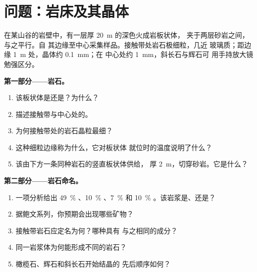 \section{问题：岩床及其晶体}

\begin{problem}
\label{pb:g11:igneous-rocks:1}
在某山谷的岩壁中，有一层厚 \qty{20}{m} 的深色火成岩板状体，
夹于两层砂岩之间，与之平行。自
其边缘至中心采集样品。接触带处岩石极细粒，几近
玻璃质；距边缘 \qty{1}{m} 处，晶体约 \qty{0.1}{mm}；在
中心处约 \qty{1}{mm}，斜长石与辉石可
用手持放大镜勉强区分。

\medskip
\noindent\textbf{第一部分——岩石。}
\begin{enumerate}
  \item 该板状体是还是？为什么？
  \item 描述接触带与中心处的。
  \item 为何接触带处的岩石晶粒最细？
  \item 这种细粒边缘称为什么，它对板状体
        就位时的温度说明了什么？
  \item 该由下方一条同种岩石的竖直板状体供给，
        厚 \qty{2}{m}，切穿砂岩。它是什么？
\end{enumerate}

\medskip
\noindent\textbf{第二部分——岩石命名。}
\begin{enumerate}[resume]
  \item 一项分析给出 \qty{49}{\percent} 、\qty{10}{\percent}
        、\qty{7}{\percent}  和 \qty{10}{\percent}
        。该岩浆是、还是？
  \item 据鲍文系列，你预期会出现哪些矿物？
  \item 接触带岩石应定名为何？哪种具有
        与之相同的成分？
  \item 同一岩浆体为何能形成不同的岩石？
  \item 橄榄石、辉石和斜长石开始结晶的
        先后顺序如何？
\end{enumerate}


\end{problem}
